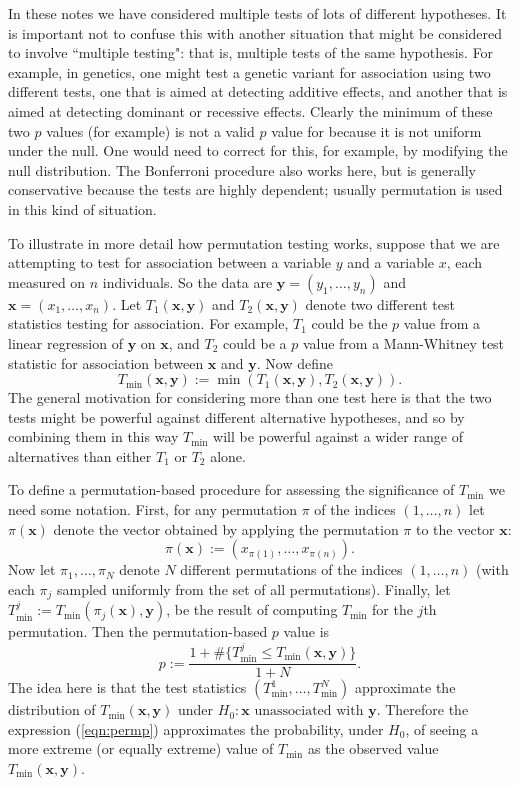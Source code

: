 \documentclass[times,11pt]{article}
\begin{document}
\def\x{\mathbf x}
\def\y{\mathbf y}
\def\Tmin{T_\text{min}}

In these notes we have considered multiple tests of lots of different hypotheses. It is important not to confuse this with another situation that might be considered to involve ``multiple testing": that is,
multiple tests of the same hypothesis. For example, 
in genetics, one might test a genetic variant for association using two different tests, one that is
aimed at detecting additive effects, and another that is aimed at detecting dominant or recessive effects.
Clearly the minimum of these two $p$ values (for example) is not a valid $p$ value for because it is not uniform under the null. One would need to correct for this, for example, by modifying the null distribution. The Bonferroni procedure also works here, but is generally conservative because the tests are highly dependent; usually permutation is used in this kind of situation. 

To illustrate in more detail how permutation testing works, 
suppose that we are attempting to test for association between a variable $y$ and a variable $x$, each measured on $n$ individuals.
So the data are $\y=(y_1,\dots,y_n)$ and $\x=(x_1,\dots,x_n)$. Let $T_1(\x,\y)$ and $T_2(\x,\y)$ denote two different test statistics testing for association. For example,
$T_1$ could be the $p$ value from a linear regression of $\y$ on $\x$, and $T_2$ could be a $p$ value from a Mann-Whitney test statistic for association between $\x$ and $\y$. Now define 
\begin{equation}
\Tmin(\x,\y):= \min(T_1(\x,\y),T_2(\x,\y)).
\end{equation}
The general motivation for considering more than one test here is that the two tests might be powerful against different alternative hypotheses, and 
so by combining them in this way $\Tmin$ will be powerful against a wider range of alternatives than either $T_1$ or $T_2$ alone.

To define a permutation-based procedure for assessing the significance of $\Tmin$ we need some notation.
First, for any permutation $\pi$ of the indices $(1,\dots,n)$ let $\pi(\x)$ denote the vector obtained by applying the permutation $\pi$ to the vector $\x$:  
\begin{equation} 
\pi(\x):=(x_{\pi(1)},\dots,x_{\pi(n)}).
\end{equation}
Now let $\pi_1,\dots,\pi_N$ denote $N$ different permutations of the indices $(1,\dots,n)$ (with each $\pi_j$ sampled uniformly from the set of all permutations).
Finally, let $\Tmin^j:= \Tmin(\pi_j(\x),\y)$, be the result of computing $\Tmin$ for the $j$th permutation.
Then the permutation-based $p$ value is
\begin{equation} \label{eqn:permp}
p:= \frac{1+\#\{\Tmin^j \leq \Tmin(\x,\y)\}}{1+N}.
\end{equation}
The idea here is that the test statistics $(\Tmin^1,\dots,\Tmin^N)$ approximate the distribution of $\Tmin(\x,\y)$ under $H_0: \text{$\x$ unassociated with $\y$}$. Therefore
the expression  (\ref{eqn:permp}) approximates the probability, under $H_0$, of seeing a more extreme (or equally extreme) value of $\Tmin$ as the observed value $\Tmin(\x,\y)$.


\end{document}

